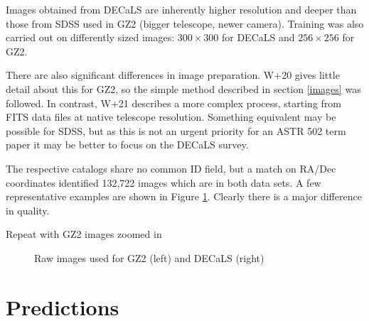\documentclass[preprint]{aastex631}
\newcommand{\todo}{\color{red}{TODO}\color{black}\hspace{2mm}}
\begin{document}
Images obtained from DECaLS are inherently higher resolution and deeper than those from SDSS used in GZ2 (bigger telescope, newer camera). Training was also carried out on differently sized images: $300 \times 300$ for DECaLS and $256 \times256$ for GZ2.

There are also significant differences in image preparation. W+20 gives little detail about this for GZ2, so the simple method described in section \ref{images} was followed.  In contrast, W+21 describes a more complex process, starting from FITS data files at native telescope resolution. Something equivalent may be possible for SDSS, but as this is not an urgent priority for an ASTR 502 term paper it may be better to focus on the DECaLS survey.

The respective catalogs share no common ID field, but a match on RA/Dec coordinates identified 132,722 images which are in both data sets. A few representative examples are shown in Figure \ref{fig:images}. Clearly there is a major difference in quality.

\todo Repeat with GZ2 images zoomed in

\begin{figure}
	\caption{Raw images used for GZ2 (left) and DECaLS (right) \label{fig:images}}
\end{figure}


\section{Predictions}

\todo

{}

\end{document}
